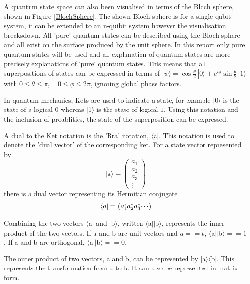 \documentclass[authoryearcitations]{UoYCSproject}
\begin{document}
A quantum state space can also been visualised in terms of the Bloch sphere, shown in Figure \ref{BlochSphere}.
The shown Bloch sphere is for a single qubit system, it can be extended to an n-quibit system however the visualisation breaksdown.
All 'pure' quantum states can be described using the Bloch sphere and all exist on the surface produced by the unit sphere.
In this report only pure quantum states will be used and all explanation of quantum states are more precisely explanations of 'pure' quantum states.
This means that all superpositions of states can be expressed in terms of $|\psi\rangle = \cos \frac{\theta}{2} \, |0 \rangle +  e^{i \phi}  \sin \frac{\theta}{2}  \,|1 \rangle $ with $0 \leq \theta \leq \pi, \quad  0 \leq \phi \leq 2 \pi$, ignoring global phase factors\cite{BlochSphereTalk}.

In quantum mechanics, Kets are used to indicate a state, for example $\vert$0$\rangle$ is the state of a logical $0$ whereas $\vert$1$\rangle$ is the state of logical $1$.
Using this notation and the inclusion of proablities, the state of the superposition can be expressed.

A dual to the Ket notation is the 'Bra' notation, $\langle$a$\vert$.
This notation is used to denote the 'dual vector' of the corresponding ket.
For a state vector represented by
\begin{equation}\label{ket_explanation_example}
\vert
a
\rangle = 
\begin{pmatrix}
a_1\\
a_2\\
a_3\\
\vdots
\end{pmatrix}
\end{equation}
there is a dual vector representing its Hermitian conjugate
\begin{equation}\label{bra_explanation_example}
\langle
a
\vert = 
\begin{pmatrix}
a_1^*$$
a_2^*$$
a_3^*$$
\cdots
\end{pmatrix}
\end{equation}

Combining the two vectors $\langle$a$\vert$ and $\vert$b$\rangle$, written $\langle$a$\vert\vert$b$\rangle$, represents the inner product of the two vectors.
If a and b are unit vectors and $a == b$, $\langle$a$\vert\vert$b$\rangle == 1$.
If a and b are orthogonal, $\langle$a$\vert\vert$b$\rangle == 0$.

The outer product of two vectors, a and b, can be represented by $\vert$a$\rangle$$\langle$b$\vert$.
This represents the transformation from a to b.
It can also be represented in matrix form.
\end{document}
